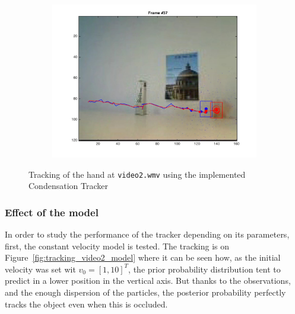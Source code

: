\documentclass{ethz_report}
\begin{document}
\begin{figure}[h]
\begin{subfigure}[b]{.25\textwidth}
    \end{subfigure}%
    \begin{subfigure}[b]{.25\textwidth}
        \centering
        \includegraphics[width=1\linewidth]{images/video2__36}
    \end{subfigure}
    \caption{Tracking of the hand at \texttt{video2.wmv} using the implemented Condensation Tracker}
    \label{fig:tracking_video2}
\end{figure}

\subsubsection*{Effect of the model}

In order to study the performance of the tracker depending on its parameters, first, the constant velocity model is tested.
The tracking is on Figure~\ref{fig:tracking_video2_model} where it can be seen how, as the initial velocity was set wit $v_0 = [ 1, 10 ]^T$, the prior probability distribution tent to predict in a lower position in the vertical axis.
But thanks to the observations, and the enough dispersion of the particles, the posterior probability perfectly tracks the object even when this is occluded.
\end{document}
